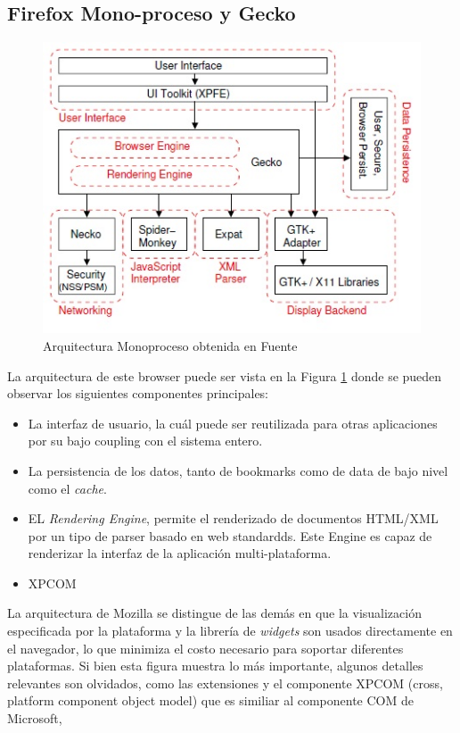     \subsection{Firefox Mono-proceso y Gecko}
        \begin{figure}[h!t]
    		\centering
        	\includegraphics[scale=0.8]{figures/archMoz.jpg}
            \caption{Arquitectura Monoproceso obtenida en Fuente \cite{2005-grosskurth-browser-refarch, preprint-grosskurth-browser-archevol}}
            \label{fig:archM}
        \end{figure}
                
        La arquitectura de este browser puede ser vista en la Figura \ref{fig:archM} donde se pueden observar los siguientes componentes principales:
                \begin{itemize}
                    \item La interfaz de usuario, la cuál puede ser reutilizada para otras aplicaciones por su bajo coupling con el sistema entero. 
                    \item La persistencia de los datos, tanto de bookmarks como de data de bajo nivel como el \textit{cache}.
                    \item EL \textit{Rendering Engine}, permite el renderizado de documentos HTML/XML por un tipo de parser basado en web standardds. Este Engine es capaz de renderizar la interfaz de la aplicación multi-plataforma.
                    \item XPCOM
                \end{itemize}
        La arquitectura de Mozilla se distingue de las demás en que la visualización especificada por la plataforma y la librería de \textit{widgets} son usados directamente en el navegador, lo que minimiza el costo necesario para soportar diferentes plataformas. Si bien esta figura muestra lo más importante, algunos detalles relevantes son olvidados, como las extensiones y el componente XPCOM (cross, platform component object model) que es similiar al componente COM de Microsoft,

